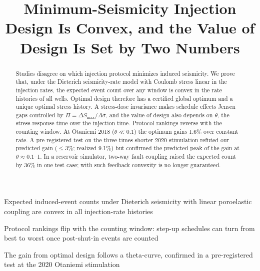 \documentclass[draft]{agujournal2019}
\begin{document}
\title{Minimum-Seismicity Injection Design Is Convex, and the Value of Design Is Set by Two Numbers}

\correspondingauthor{[Name]}{[email]}

\begin{keypoints}
\item Expected induced-event counts under Dieterich seismicity with linear poroelastic coupling are convex in all injection-rate histories
\item Protocol rankings flip with the counting window: step-up schedules can turn from best to worst once post-shut-in events are counted
\item The gain from optimal design follows a theta-curve, confirmed in a pre-registered test at the 2020 Otaniemi stimulation
\end{keypoints}

\begin{abstract}
Studies disagree on which injection protocol minimizes induced seismicity. We prove that, under the Dieterich seismicity-rate model with
Coulomb stress linear in the injection rates, the expected event count over any window is convex in the rate histories of all wells.
Optimal design therefore has a certified global optimum and a unique optimal stress history. A stress-dose invariance makes schedule effects
Jensen gaps controlled by $\Pi=\Delta S_{\max}/A\bar\sigma$, and the value of design also depends on $\theta$, the stress-response time over the
injection time. Protocol rankings reverse with the counting window. At Otaniemi 2018 ($\theta\ll0.1$) the optimum gains 1.6\% over constant
rate. A pre-registered test on the three-times-shorter 2020 stimulation refuted our predicted gain ($\le3$\%; realized 9.1\%) but confirmed
the predicted peak of the gain at $\theta\approx0.1$--1. In a reservoir simulator, two-way fault coupling raised the expected count by 36\% in one test case; with such feedback convexity is no longer guaranteed.
\end{abstract}
\end{document}
